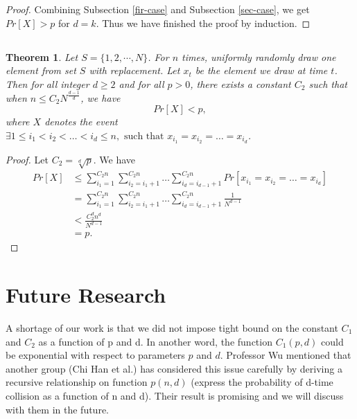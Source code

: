 \documentclass{article}
\newtheorem{theorem}{Theorem}
\begin{document}
\begin{spacing}{1.1}
\begin{proof}
    Combining Subsection \ref{fir-case} and Subsection \ref{sec-case}, we get $Pr[X] > p$ for $d = k$. Thus we have finished the proof by induction.
    \end{proof}


    \subsection{}

    \begin{theorem}

    Let $S = \{1, 2, \cdots, N\}$. For $n$ times, uniformly randomly draw one element from set $S$ with replacement. Let $x_t$ be the element we draw at time $t$. Then for all integer $d\geq 2$ and for all $p > 0$, there exists a constant $C_2$ such that when $n \leq C_2 {N}^{\frac{d-1}{d}}$, we have
    $$Pr[X] < p,$$
    where $X$ denotes the event $\exists 1\leq i_1< i_2<\dots<i_d \leq n, \text{ such that } x_{i_1} = x_{i_2}=\dots=x_{i_d}$.

    \end{theorem}

    \begin{proof}

    Let $C_2=\sqrt[d]{p}$. We have
    \begin{align*}
    Pr[X]
    &\leq \sum_{i_1=1}^{C_2n}\sum_{i_2=i_1+1}^{C_2n}\dots\sum_{i_d=i_{d-1}+1}^{C_2n}Pr[x_{i_1} = x_{i_2}=\dots=x_{i_d}]  \\
    &=\sum_{i_1=1}^{C_2n}\sum_{i_2=i_1+1}^{C_2n}\dots\sum_{i_d=i_{d-1}+1}^{C_2n}\frac{1}{N^{d-1}}  \\
    &<\frac{C_2^dn^d}{N^{d-1}}  \\
    &=p.
    \end{align*}

    \end{proof}

    \section{Future Research}
    A shortage of our work is that we did not impose tight bound on the constant $C_1$ and $C_2$ as a function of p and d. In another word, the function $C_1(p, d)$ could be exponential with respect to parameters $p$ and $d$. Professor Wu mentioned that another group (Chi Han et al.) has considered this issue carefully by deriving a recursive relationship on function $p(n, d)$ (express the probability of d-time collision as a function of n and d). Their result is promising and we will discuss with them in the future.


\end{spacing}
\end{document}
